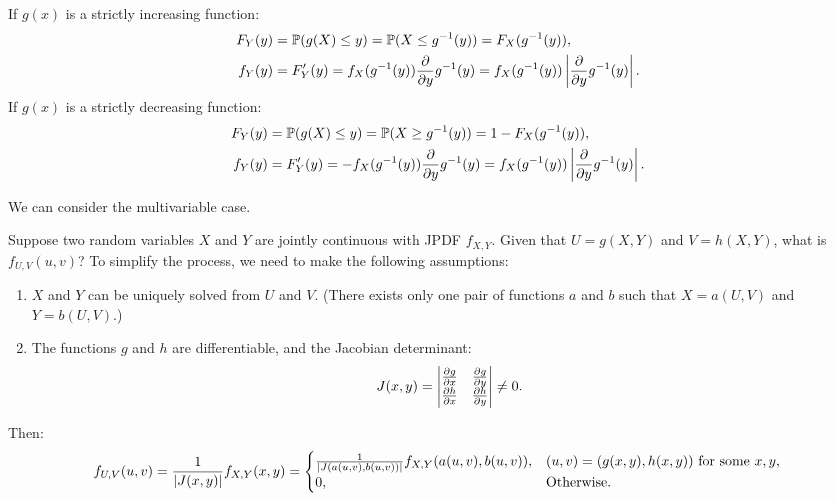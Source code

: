\documentclass{huhtakm-template-book-v2}
\newcommand{\prob}{\mathbb{P}}
\begin{document}
    \begin{proofing}
        If $g(x)$ is a strictly increasing function:
        \begin{align*}
            F_{Y}(y) &= \prob(g(X) \leq y) = \prob(X \leq g^{-1}(y)) = F_{X}(g^{-1}(y)),\\
            f_{Y}(y) &= F_{Y}'(y) = f_{X}(g^{-1}(y))\pdv*{g^{-1}(y)}{y} = f_{X}(g^{-1}(y))\abs{\pdv*{g^{-1}(y)}{y}}.
        \end{align*}
        If $g(x)$ is a strictly decreasing function:
        \begin{align*}
            F_{Y}(y) &= \prob(g(X) \leq y) = \prob(X \geq g^{-1}(y)) = 1-F_{X}(g^{-1}(y)),\\
            f_{Y}(y) &= F_{Y}'(y) = -f_{X}(g^{-1}(y))\pdv*{g^{-1}(y)}{y} = f_{X}(g^{-1}(y))\abs{\pdv*{g^{-1}(y)}{y}}.
        \end{align*}
    \end{proofing}
    We can consider the multivariable case.
    \begin{eg}
        Suppose two random variables $X$ and $Y$ are jointly continuous with JPDF $f_{X,Y}$. Given that $U = g(X,Y)$ and $V = h(X,Y)$, what is $f_{U,V}(u, v)$? To simplify the process, we need to make the following assumptions:
        \begin{enumerate}
            \item $X$ and $Y$ can be uniquely solved from $U$ and $V$. (There exists only one pair of functions $a$ and $b$ such that $X = a(U,V)$ and $Y = b(U,V)$.)
            \item The functions $g$ and $h$ are differentiable, and the Jacobian determinant:
            \begin{equation*}
                J(x, y) = \begin{vmatrix}
                    \pdv{g}{x} & \pdv{g}{y}\\
                    \pdv{h}{x} & \pdv{h}{y}
                \end{vmatrix} \neq 0.
            \end{equation*}
        \end{enumerate}
        Then:
        \begin{equation*}
            f_{U,V}(u, v) = \frac{1}{\left|{J(x, y)}\right|}f_{X,Y}(x, y) = \begin{cases}
                \frac{1}{\left|{J(a(u, v),b(u, v))}\right|}f_{X,Y}(a(u, v),b(u, v)), &(u, v) = (g(x, y),h(x, y))\text{ for some }x,y,\\
                0, &\text{Otherwise}.
            \end{cases}
        \end{equation*}
    \end{eg}
    \newpage
\end{document}
